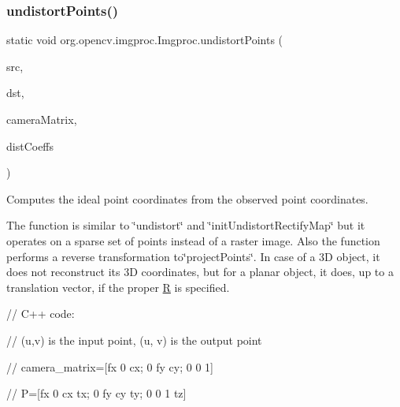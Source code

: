 \subsubsection{\texorpdfstring{undistort\+Points()}{undistortPoints()}\hspace{0.1cm}{\footnotesize\ttfamily [2/2]}}
{\footnotesize\ttfamily static void org.\+opencv.\+imgproc.\+Imgproc.\+undistort\+Points (\begin{DoxyParamCaption}\item[{\mbox{\hyperlink{classorg_1_1opencv_1_1core_1_1_mat_of_point2f}{Mat\+Of\+Point2f}}}]{src,  }\item[{\mbox{\hyperlink{classorg_1_1opencv_1_1core_1_1_mat_of_point2f}{Mat\+Of\+Point2f}}}]{dst,  }\item[{\mbox{\hyperlink{classorg_1_1opencv_1_1core_1_1_mat}{Mat}}}]{camera\+Matrix,  }\item[{\mbox{\hyperlink{classorg_1_1opencv_1_1core_1_1_mat}{Mat}}}]{dist\+Coeffs }\end{DoxyParamCaption})\hspace{0.3cm}{\ttfamily [static]}}

Computes the ideal point coordinates from the observed point coordinates.

The function is similar to \char`\"{}undistort\char`\"{} and \char`\"{}init\+Undistort\+Rectify\+Map\char`\"{} but it operates on a sparse set of points instead of a raster image. Also the function performs a reverse transformation to\char`\"{}project\+Points\char`\"{}. In case of a 3D object, it does not reconstruct its 3D coordinates, but for a planar object, it does, up to a translation vector, if the proper {\ttfamily \mbox{\hyperlink{classorg_1_1opencv_1_1_r}{R}}} is specified. {\ttfamily }

{\ttfamily }

{\ttfamily }

{\ttfamily // C++ code\+:}

{\ttfamily }

{\ttfamily }

{\ttfamily // (u,v) is the input point, (u\textquotesingle{}, v\textquotesingle{}) is the output point}

{\ttfamily }

{\ttfamily }

{\ttfamily // camera\+\_\+matrix=\mbox{[}fx 0 cx; 0 fy cy; 0 0 1\mbox{]}}

{\ttfamily }

{\ttfamily }

{\ttfamily // P=\mbox{[}fx\textquotesingle{} 0 cx\textquotesingle{} tx; 0 fy\textquotesingle{} cy\textquotesingle{} ty; 0 0 1 tz\mbox{]}}

